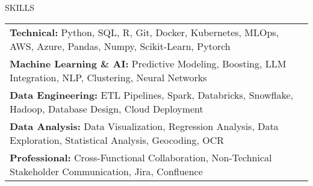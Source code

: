 \begin{rSection}{SKILLS}
    \begin{tabular}{ @{} p{\textwidth} @{} }
    \textbf{Technical:} Python, SQL, R, Git, Docker, Kubernetes, MLOps, AWS, Azure, Pandas, Numpy, Scikit-Learn, Pytorch \\
    \textbf{Machine Learning \& AI:} Predictive Modeling, Boosting, LLM Integration, NLP, Clustering, Neural Networks \\
    \textbf{Data Engineering:} ETL Pipelines, Spark, Databricks, Snowflake, Hadoop, Database Design, Cloud Deployment \\
    \textbf{Data Analysis:} Data Visualization, Regression Analysis, Data Exploration, Statistical Analysis, Geocoding, OCR  \\
    \textbf{Professional:} Cross-Functional Collaboration, Non-Technical Stakeholder Communication, Jira, Confluence
    \end{tabular}
\end{rSection}